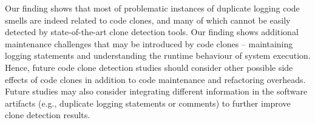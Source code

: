 




 Our finding shows that most of problematic instances of duplicate logging code smells are indeed related to code clones, and many of which cannot be easily detected by state-of-the-art clone detection tools. Our finding shows additional maintenance challenges that may be introduced by code clones -- maintaining logging statements and understanding the runtime behaviour of system execution. %
Hence, future code clone detection studies should consider other possible side effects of code clones in addition to code maintenance and refactoring overheads. Future studies may also consider integrating different information in the software artifacts (e.g., duplicate logging statements or comments) to further improve clone detection results. %



